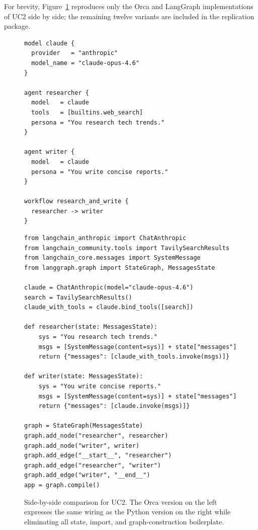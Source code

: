 \documentclass[sigconf,nonacm]{acmart}
\begin{document}
For brevity, Figure~\ref{fig:uc2-sidebyside} reproduces only the Orca and
LangGraph implementations of UC2 side by side; the remaining twelve
variants are included in the replication package.

\begin{figure}[t]
\begin{minipage}[t]{0.46\linewidth}
\begin{lstlisting}[caption={UC2 in Orca (16 SLOC).},label={lst:uc2-orca}]
model claude {
  provider   = "anthropic"
  model_name = "claude-opus-4.6"
}

agent researcher {
  model   = claude
  tools   = [builtins.web_search]
  persona = "You research tech trends."
}

agent writer {
  model   = claude
  persona = "You write concise reports."
}

workflow research_and_write {
  researcher -> writer
}
\end{lstlisting}
\end{minipage}
\hfill
\begin{minipage}[t]{0.50\linewidth}
\begin{lstlisting}[style=pythonStyle,caption={UC2 in Python + LangGraph (22 SLOC).},label={lst:uc2-langgraph}]
from langchain_anthropic import ChatAnthropic
from langchain_community.tools import TavilySearchResults
from langchain_core.messages import SystemMessage
from langgraph.graph import StateGraph, MessagesState

claude = ChatAnthropic(model="claude-opus-4.6")
search = TavilySearchResults()
claude_with_tools = claude.bind_tools([search])

def researcher(state: MessagesState):
    sys = "You research tech trends."
    msgs = [SystemMessage(content=sys)] + state["messages"]
    return {"messages": [claude_with_tools.invoke(msgs)]}

def writer(state: MessagesState):
    sys = "You write concise reports."
    msgs = [SystemMessage(content=sys)] + state["messages"]
    return {"messages": [claude.invoke(msgs)]}

graph = StateGraph(MessagesState)
graph.add_node("researcher", researcher)
graph.add_node("writer", writer)
graph.add_edge("__start__", "researcher")
graph.add_edge("researcher", "writer")
graph.add_edge("writer", "__end__")
app = graph.compile()
\end{lstlisting}
\end{minipage}
\caption{Side-by-side comparison for UC2. The Orca version on the left
expresses the same wiring as the Python version on the right while
eliminating all state, import, and graph-construction boilerplate.}
\label{fig:uc2-sidebyside}
\end{figure}
\end{document}
